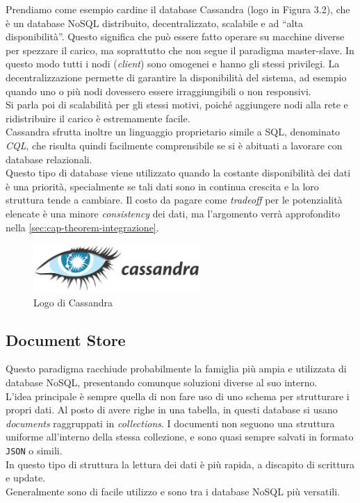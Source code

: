 \noindent Prendiamo come esempio cardine il database Cassandra (logo in Figura 3.2), che è un database NoSQL distribuito, decentralizzato, scalabile e ad ``alta disponibilità''\cite{site:udemycassandra}. Questo significa che può essere fatto operare su macchine diverse per spezzare il carico, ma soprattutto che non segue il paradigma \gls{master-slave}. In questo modo tutti i nodi (\textit{client}) sono omogenei e hanno gli stessi privilegi. La decentralizzazione permette di garantire la disponibilità del sistema, ad esempio quando uno o più nodi dovessero essere irraggiungibili o non responsivi.\\
Si parla poi di scalabilità per gli stessi motivi, poiché aggiungere nodi alla rete e ridistribuire il carico è estremamente facile.\\
Cassandra sfrutta inoltre un linguaggio proprietario simile a \gls{SQL}, denominato \textit{CQL}, che risulta quindi facilmente comprensibile se si è abituati a lavorare con database relazionali.\\

\noindent Questo tipo di database viene utilizzato quando la costante disponibilità dei dati è una priorità, specialmente se tali dati sono in continua crescita e la loro struttura tende a cambiare. Il costo da pagare come \textit{tradeoff} per le potenzialità elencate è una minore \textit{consistency} dei dati, ma l'argomento verrà approfondito nella \autoref{sec:cap-theorem-integrazione}.

\begin{figure}[htbp]
\begin{center}
\includegraphics[height=5em]{immagini/tecnologies-logos/Cassandra-Logo-h.png}
\caption{Logo di Cassandra}
\end{center}
\end{figure}

\subsection{Document Store}
Questo paradigma racchiude probabilmente la famiglia più ampia e utilizzata di database NoSQL, presentando comunque soluzioni diverse al suo interno\cite{site:mongoarticletypes}.\\
L'idea principale è sempre quella di non fare uso di uno schema per strutturare i propri dati. Al posto di avere righe in una tabella, in questi database si usano \textit{documents} raggruppati in \textit{collections}. I documenti non seguono una struttura uniforme all'interno della stessa collezione, e sono quasi sempre salvati in formato \texttt{JSON} o simili.\\
In questo tipo di struttura la lettura dei dati è più rapida, a discapito di scrittura e update.\\
Generalmente sono di facile utilizzo e sono tra i database NoSQL più versatili.\\

